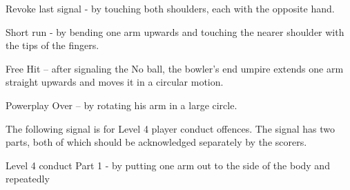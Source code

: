 \documentclass[12pt]{article}
\begin{document}
\vspace{\baselineskip}
\begin{adjustwidth}{1.0in}{0.0in}
{\fontsize{9pt}{10.8pt}\selectfont Revoke last signal - by touching both shoulders, each with the opposite hand.\par}\par

\end{adjustwidth}


\vspace{\baselineskip}
\begin{adjustwidth}{1.0in}{0.35in}
{\fontsize{9pt}{10.8pt}\selectfont Short run - by bending one arm upwards and touching the nearer shoulder with the tips of the fingers.\par}\par

\end{adjustwidth}


\vspace{\baselineskip}
\begin{adjustwidth}{1.0in}{0.19in}
{\fontsize{9pt}{10.8pt}\selectfont Free Hit – after signaling the No ball, the bowler’s end umpire extends one arm straight upwards and moves it in a circular motion.\par}\par

\end{adjustwidth}


\vspace{\baselineskip}
\begin{adjustwidth}{1.0in}{0.0in}
{\fontsize{9pt}{10.8pt}\selectfont Powerplay Over – by rotating his arm in a large circle.\par}\par

\end{adjustwidth}


\vspace{\baselineskip}
\begin{adjustwidth}{1.0in}{0.07in}
{\fontsize{9pt}{10.8pt}\selectfont The following signal is for Level 4 player conduct offences. The signal has two parts, both of which should be acknowledged separately by the scorers.\par}\par

\end{adjustwidth}


\vspace{\baselineskip}
\begin{adjustwidth}{1.0in}{0.0in}
{\fontsize{9pt}{10.8pt}\selectfont Level 4 conduct \tabto{2.49in} Part 1 - by putting one arm out to the side of the body and repeatedly\par}\par

\end{adjustwidth}
\end{document}
